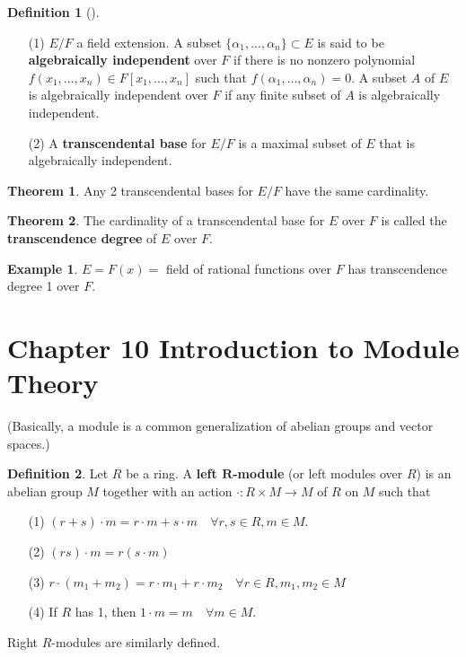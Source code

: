 \documentclass{article}
\theoremstyle{definition}
\newtheorem{thm}{Theorem}
\newtheorem{ex}{Example}
\newtheorem{dfn}{Definition}
\newenvironment{dfns}[1][]{%
  \begin{dfn}[#1]$ $\par\nobreak\ignorespaces
}{%
  \end{dfn}
}
\begin{document}
\begin{dfns}
	\begin{enumerate}
		\item[(1)] $E/F$ a field extension.
			A subset $\{\alpha_1, ..., \alpha_n\} \subset E$ is said to be \textbf{algebraically independent} over $F$ if there is no nonzero polynomial $f(x_1, ..., x_n) \in F[x_1, ..., x_n]$ such that $f(\alpha_1, ..., \alpha_n) = 0$.
			A subset $A$ of $E$ is algebraically independent over $F$ if any finite subset of $A$ is algebraically independent.

		\item[(2)] A \textbf{transcendental base} for $E/F$ is a maximal subset of $E$ that is algebraically independent.
	\end{enumerate}
\end{dfns}

\begin{thm}
	Any 2 transcendental bases for $E/F$ have the same cardinality.
\end{thm}

\begin{thm}
	The cardinality of a transcendental base for $E$ over $F$ is called the \textbf{transcendence degree} of $E$ over $F$.
\end{thm}

\begin{ex}
	$E = F(x) =$ field of rational functions over $F$ has transcendence degree 1 over $F$.
\end{ex}

\section*{Chapter 10 Introduction to Module Theory}

(Basically, a module is a common generalization of abelian groups and vector spaces.)

\begin{dfn}
	Let $R$ be a ring.
	A \textbf{left $\bm{R}$-module} (or left modules over $R$) is an abelian group $M$ together with an action $\cdot: R \times M \to M$ of $R$ on $M$ such that
	\begin{enumerate}
		\item[(1)] $(r + s) \cdot m = r \cdot m + s \cdot m \quad \forall r, s \in R, m \in M$.

		\item[(2)] $(r s) \cdot m = r (s \cdot m)$

		\item[(3)] $r\cdot (m_1 + m_2) = r \cdot m_1 + r \cdot m_2 \quad \forall r \in R, m_1, m_2 \in M$

		\item[(4)] If $R$ has 1, then $1 \cdot m = m \quad \forall m \in M$.
	\end{enumerate}
	Right $R$-modules are similarly defined.
\end{dfn}
\end{document}
